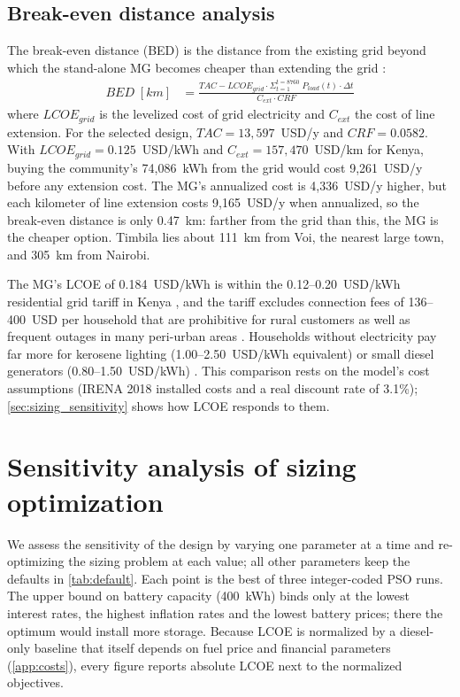\documentclass[final,3p,times]{elsarticle}
\begin{document}
\subsection{Break-even distance analysis}

The break-even distance (BED) is the distance from the existing grid beyond which the stand-alone MG becomes cheaper than extending the grid \cite{kaabeche2011a}:
\begin{align*}
    BED \; [km] & = \frac{TAC - LCOE_{grid} \cdot \Sigma_{t=1}^{t=8760}\; P_{load}(t)\cdot \Delta t}{C_{ext} \cdot CRF}
\end{align*}
where $LCOE_{grid}$ is the levelized cost of grid electricity and $C_{ext}$ the cost of line extension. For the selected design, $TAC = 13,597$~USD/y and $CRF = 0.0582$. With $LCOE_{grid} = 0.125$~USD/kWh \cite{LCOEgrid} and $C_{ext} = 157,470$~USD/km \cite{Cext} for Kenya, buying the community's 74,086~kWh from the grid would cost 9,261~USD/y before any extension cost. The MG's annualized cost is 4,336~USD/y higher, but each kilometer of line extension costs 9,165~USD/y when annualized, so the break-even distance is only 0.47~km: farther from the grid than this, the MG is the cheaper option. Timbila lies about 111~km from Voi, the nearest large town, and 305~km from Nairobi.

The MG's LCOE of 0.184~USD/kWh is within the 0.12--0.20~USD/kWh residential grid tariff in Kenya \cite{LCOEgrid}, and the tariff excludes connection fees of 136--400~USD per household that are prohibitive for rural customers \cite{quak_CBA, golumbeanu2013} as well as frequent outages in many peri-urban areas \cite{iea_africa2019}. Households without electricity pay far more for kerosene lighting (1.00--2.50~USD/kWh equivalent) \cite{tracy2012} or small diesel generators (0.80--1.50~USD/kWh) \cite{quak_CBA}. This comparison rests on the model's cost assumptions (IRENA 2018 installed costs and a real discount rate of 3.1\%); \cref{sec:sizing_sensitivity} shows how LCOE responds to them.

\section{Sensitivity analysis of sizing optimization\label{sec:sizing_sensitivity}}

We assess the sensitivity of the design by varying one parameter at a time and re-optimizing the sizing problem at each value; all other parameters keep the defaults in \cref{tab:default}. Each point is the best of three integer-coded PSO runs. The upper bound on battery capacity (400~kWh) binds only at the lowest interest rates, the highest inflation rates and the lowest battery prices; there the optimum would install more storage. Because LCOE is normalized by a diesel-only baseline that itself depends on fuel price and financial parameters (\cref{app:costs}), every figure reports absolute LCOE next to the normalized objectives.
\end{document}
